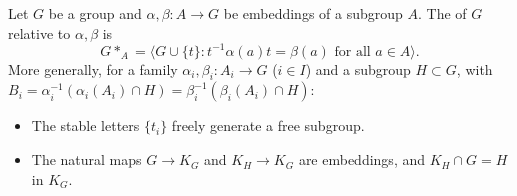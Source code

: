 Let $G$ be a group and $\alpha, \beta : A \to G$ be embeddings of a subgroup $A$. The  of $G$ relative to $\alpha, \beta$ is
$$G *_A = \langle G \cup \{t\} : t^{-1}\alpha(a)t = \beta(a) \text{ for all } a \in A \rangle.$$
More generally, for a family $\alpha_i, \beta_i : A_i \to G$ ($i \in I$) and a subgroup $H \subset G$, with $B_i = \alpha_i^{-1}(\alpha_i(A_i) \cap H) = \beta_i^{-1}(\beta_i(A_i) \cap H)$:
\begin{itemize}
\item[(a)] The stable letters $\{t_i\}$ freely generate a free subgroup.
\item[(b)] The natural maps $G \to K_G$ and $K_H \to K_G$ are embeddings, and $K_H \cap G = H$ in $K_G$.
\end{itemize}
